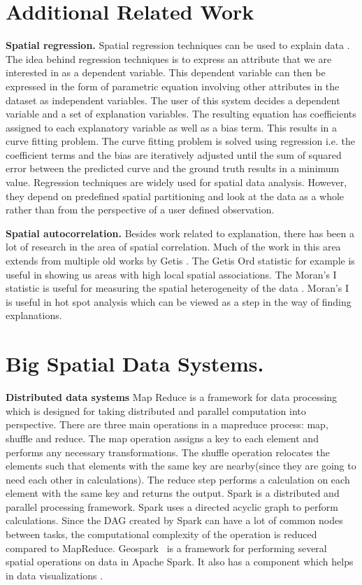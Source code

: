 \appendix
\section{Additional Related Work}
{\bf Spatial regression.} Spatial regression techniques can be used to explain data \cite{dunn1986applied,cleveland1988locally}. The idea behind regression techniques is to express an attribute that we are interested in as a dependent variable. This dependent variable can then be expressed in the form of parametric equation involving other attributes in the dataset as independent variables. The user of this system decides a dependent variable and a set of explanation variables. The resulting equation has coefficients assigned to each explanatory variable as well as a bias term. This results in a curve fitting problem. The curve fitting problem is solved using regression i.e. the coefficient terms and the bias are iteratively adjusted until the sum of squared error between the predicted curve and the ground truth results in a minimum value. Regression techniques are widely used for spatial data analysis. However, they depend on predefined spatial partitioning and look at the data as a whole rather than from the perspective of a user defined observation.

{\bf Spatial autocorrelation.} Besides work related to explanation, there has been a lot of research in the area of spatial correlation. Much of the work in this area extends from multiple old works by Getis \cite{getis1991spatial,ord1995local,getis1996local,getis2002comparative,getis2007reflections}. The Getis Ord statistic \cite{ord1995local} for example is useful in showing us areas with high local spatial associations. The Moran's I statistic is useful for measuring the spatial heterogeneity of the data \cite{assuncao1999new,zhang2008use}. Moran's I is useful in hot spot analysis which can be viewed as a step in the way of finding explanations.


\section{Big Spatial Data Systems.}
{\bf Distributed data systems} Map Reduce \cite{dean2008mapreduce} is a framework for data processing which is designed for taking distributed and parallel computation into perspective. There are three main operations in a mapreduce process: map, shuffle and reduce. The map operation assigns a key to each element and performs any necessary transformations. The shuffle operation relocates the elements such that elements with the same key are nearby(since they are going to need each other in calculations). The reduce step performs a calculation on each element with the same key and returns the output. Spark \cite{shanahan2015large,zaharia2016apache} is a distributed and parallel processing framework. Spark uses a directed acyclic graph to perform calculations. Since the DAG created by Spark can have a lot of common nodes between tasks, the computational complexity of the operation is reduced compared to MapReduce.
Geospark~ \cite{yu2015geospark} is a framework for performing several spatial operations on data in Apache Spark. It also has a component which helps in data visualizations \cite{yu2018src}.